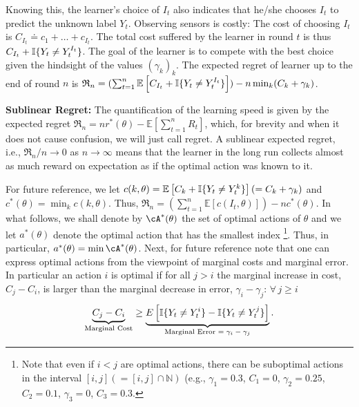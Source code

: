 \documentclass[11pt]{article} %
\newcommand{\todom}[2][]{\todo[color=Cerulean!20,size=\tiny,#1]{M: #2}}
\newcommand{\N}{\mathbb{N}}
\newcommand{\EE}[1]{\mathbb{E}\left[#1\right]}
\newcommand{\Regret}{\mathfrak{R}}
\begin{document}
\todom{How about this figure and caption?}
Knowing this, the learner's choice of $I_t$ also indicates that he/she chooses $I_t$ to predict the unknown label $Y_t$.
Observing sensors is costly: The cost of choosing $I_t$ is $C_{I_t} \doteq c_1 + \dots + c_{I_t}$.
The total cost suffered by the learner in round $t$ is thus $C_{I_t} + \mathbb{I}\{Y_t \ne Y_t^{I_t}\}$.
The goal of the learner is to compete with the best choice given the hindsight of the values $(\gamma_k)_k$.
The expected regret of learner up to the end of round $n$ is 
$\Regret_n =( \sum_{t=1}^n \EE{ C_{I_t} +\ind{Y_t \ne Y_t^{I_t} }} )- n \min_k (C_k + \gamma_k)$.

\noindent
{\bf Sublinear Regret:} The quantification of the learning speed is given by the expected regret 
$\Regret_n = n r^*(\theta) - \EE{\sum_{t=1}^n R_t}$, which, for brevity and when it does not cause confusion, 
we will just call regret. A sublinear expected regret, i.e., $\Regret_n/n \to 0$ as $n\to \infty$ means that the learner in the long run collects almost as much reward on expectation as if the optimal action was known to it.

For future reference, we let $c(k,\theta) = \EE{ C_{k} +\ind{Y_t \ne Y_t^{k} }}  (= C_k + \gamma_k)$ and $c^*(\theta) = \min_k c(k,\theta)$. Thus, $\Regret_n =( \sum_{t=1}^n \EE{ c(I_t,\theta) }) - n c^*(\theta)$.
In what follows, we shall denote by $\cA^*(\theta)$ the set of optimal actions of $\theta$
and we let $a^*(\theta)$ denote the optimal action that has the smallest index
\footnote{Note that even if $i<j$ are optimal actions, there can be suboptimal actions in the interval $[i,j] (=[i,j]\cap \N)$
(e.g., $\gamma_1=0.3$, $C_1=0$, $\gamma_2=0.25$, $C_2=0.1$, $\gamma_3=0$, $C_3=0.3$.}. Thus,
in particular, $a^*(\theta) = \min \cA^*(\theta)$. 
Next, for future reference note that one 
can express optimal actions from the viewpoint of marginal costs and marginal error. 
In particular an action $i$ is optimal if for all $j > i$ the marginal increase in cost, $C_j - C_i$, 
is larger than the marginal decrease in error, $\gamma_i - \gamma_j$: $ \forall \, j \geq i\,$
%
\begin{equation} \label{eqn:interp_opt}
\vspace{-5pt}
\underbrace{C_j - C_i}_{\text{Marginal Cost}} \geq \underbrace{ E \left [ \ind{Y_t \ne Y_t^i} - \ind{Y_t \ne Y_t^j} \right ]}_{\text{Marginal Error $= \gamma_i-\gamma_j$}}.
\end{equation}
\end{document}
